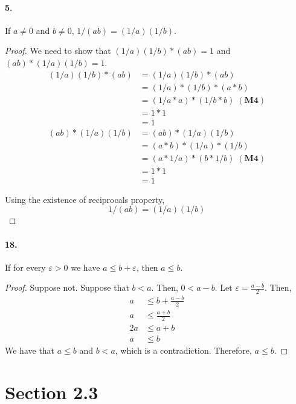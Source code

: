 \documentclass[12pt]{article}
\theoremstyle{remark}
\begin{document}
\paragraph{5.} If $a \neq 0$ and $b \neq 0$, $1 / (ab) = (1 / a)(1 / b)$. 
\begin{proof}
    We need to show that $(1/a)(1/b) * (ab) = 1$ and $(ab) * (1/a)(1/b) = 1$.
    \begin{align*}
        (1/a)(1/b) * (ab) &= (1/a)(1/b) * (ab) \\
        &= (1/a) * (1/b) * (a * b) \\
        &= (1/a * a) * (1/b * b) \mathbf{\;(M4)} \\
        &= 1 * 1 \\
        &= 1
    \end{align*}
    \begin{align*}
        (ab) * (1/a)(1/b) &= (ab) * (1/a)(1/b) \\
        &= (a * b) * (1/a) * (1/b) \\
        &= (a * 1/a) * (b * 1/b) \mathbf{\;(M4)} \\
        &= 1 * 1 \\
        &= 1
    \end{align*}
    
    Using the existence of reciprocals property,
    $$1 / (ab) = (1 / a)(1 / b)$$
\end{proof}

\paragraph{18.} If for every $\varepsilon > 0$ we have $a \leq b + \varepsilon$, then $a \leq b$.
\begin{proof}
    Suppose not. Suppose that $b < a$. Then, $0 < a - b$. Let $\varepsilon = \frac{a - b}{2}$. Then,
    \begin{align*}
        a &\leq b + \frac{a - b}{2} \\
        a &\leq \frac{a + b}{2} \\
        2a &\leq a + b \\
        a &\leq b
    \end{align*}
    We have that $a \leq b$ and $b < a$, which is a contradiction. Therefore, $a \leq b$.
\end{proof}

\section*{Section 2.3}
\end{document}
